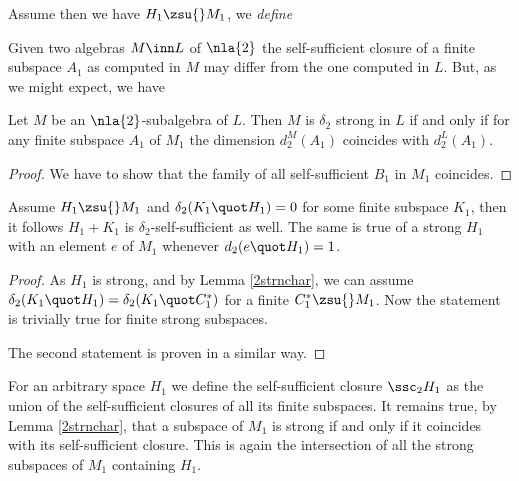Assume then we have $H_{1}\zsu{}M_{1}$, we {\em define} 


\medskip
Given two algebras $M\inn L$ of $\nla{2}$ the self-sufficient
closure of a finite subspace $A_{1}$ as computed in $M$ may differ from the one computed in $L$. But, as we might expect, we have
\begin{cor}\label{d2coerente}
Let $M$ be an $\nla{2}$-subalgebra of $L$. Then $M$ is $\delta_{2}$ strong in $L$ if and only if for any finite subspace
$A_{1}$ of $M_{1}$ the dimension $d_{2}^{M}(A_{1})$ coincides with $d_{2}^{L}(A_{1})$.
\end{cor}
\begin{proof}
We have to show that the family of all self-sufficient $B_{1}$ in $M_{1}$ coincides.

\end{proof}

\begin{lem}\label{samedelta2}
Assume $H_{1}\zsu{} M_{1}$ and $\delta_{2}(K_{1}\quot H_{1})=0$ for some finite subspace $K_{1}$, then it follows
$H_{1}+K_{1}$ is $\delta_{2}$-self-sufficient as well.
The same is true of a strong $H_{1}$ with an element $e$ of $M_{1}$ whenever $d_{2}(e\quot H_{1})=1$.
\end{lem}
\begin{proof}
As $H_{1}$ is strong, and by Lemma \ref{2strnchar},
we can assume $\delta_{2}(K_{1}\quot H_{1})=\delta_{2}(K_{1}
\quot C_{1}^{*})$ for a finite $C_{1}^{*}\zsu{} M_{1}$.
Now the statement is trivially true for finite strong subspaces.

The second statement is proven in a similar way.
\end{proof}

For an arbitrary space $H_{1}$ we
define the self-sufficient closure $\ssc_{2}H_{1}$ as the union
of the self-sufficient closures of all its finite subspaces.
It remains true, by Lemma \ref{2strnchar}, that a subspace of $M_{1}$ is strong if and only if it coincides with its self-sufficient closure. This is again the intersection of all the strong subspaces of $M_{1}$ containing $H_{1}$.


